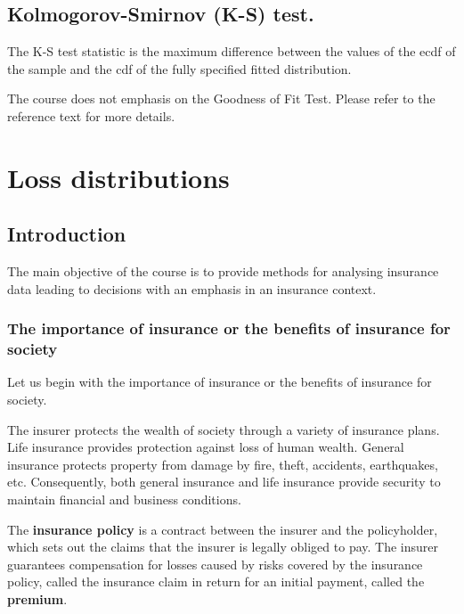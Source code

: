 \documentclass[landscape, 20pt]{extreport}
\theoremstyle{definition}
\theoremstyle{definition}
\theoremstyle{definition}
\theoremstyle{definition}
\theoremstyle{remark}
\begin{document}
\hypertarget{kolmogorov-smirnov-k-s-test.}{%
\section{Kolmogorov-Smirnov (K-S) test.}\label{kolmogorov-smirnov-k-s-test.}}

The K-S test statistic is the maximum difference between the values of
the ecdf of the sample and the cdf of the fully specified fitted
distribution.

The course does not emphasis on the Goodness of Fit Test. Please refer
to the reference text for more details.

\hypertarget{loss-distributions}{%
\chapter{Loss distributions}\label{loss-distributions}}

\hypertarget{introduction}{%
\section{Introduction}\label{introduction}}

The main objective of the course is to provide methods for analysing insurance data leading to decisions with an emphasis in an insurance context.

\hypertarget{the-importance-of-insurance-or-the-benefits-of-insurance-for-society}{%
\subsection{The importance of insurance or the benefits of insurance for society}\label{the-importance-of-insurance-or-the-benefits-of-insurance-for-society}}

Let us begin with the importance of insurance or the benefits of insurance for society.

The insurer protects the wealth of society through a variety of insurance plans. Life insurance provides protection against loss of human wealth. General insurance protects property from damage by fire, theft, accidents, earthquakes, etc. Consequently, both general insurance and life insurance provide security to maintain financial and business conditions.

The \textbf{insurance policy} is a contract between the insurer and the policyholder, which sets out the claims that the insurer is legally obliged to pay. The insurer guarantees compensation for losses caused by risks covered by the insurance policy, called the insurance claim in return for an initial payment, called the \textbf{premium}.
\end{document}
